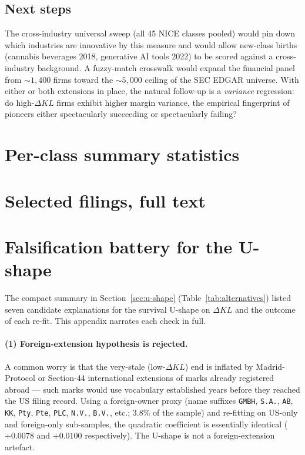 \documentclass[11pt]{article}
\begin{document}
\subsection*{Next steps}
The cross-industry universal sweep (all 45 NICE classes pooled) would
pin down which industries are innovative by this measure and would
allow new-class births (cannabis beverages 2018, generative AI tools
2022) to be scored against a cross-industry background. A
fuzzy-match crosswalk would expand the financial panel from $\sim 1{,}400$
firms toward the ${\sim}5{,}000$ ceiling of the SEC EDGAR universe. With
either or both extensions in place, the natural follow-up is a
\emph{variance} regression: do high-$\Delta KL$ firms exhibit higher
margin variance, the empirical fingerprint of pioneers either
spectacularly succeeding or spectacularly failing?

\appendix
\section{Per-class summary statistics}
\label{app:summary}



\section{Selected filings, full text}
\label{app:filings}



\section{Falsification battery for the U-shape}
\label{app:falsification}

The compact summary in Section~\ref{sec:u-shape}
(Table~\ref{tab:alternatives}) listed seven candidate explanations
for the survival U-shape on $\Delta KL$ and the outcome of each
re-fit. This appendix narrates each check in full.

\paragraph{(1) Foreign-extension hypothesis is rejected.}
A common worry is that the very-stale (low-$\Delta KL$) end is
inflated by Madrid-Protocol or Section-44 international extensions
of marks already registered abroad --- such marks would use
vocabulary established years before they reached the US filing
record. Using a foreign-owner proxy (name suffixes \texttt{GMBH},
\texttt{S.A.}, \texttt{AB}, \texttt{KK}, \texttt{Pty}, \texttt{Pte},
\texttt{PLC}, \texttt{N.V.}, \texttt{B.V.}, etc.; $3.8\%$ of the
sample) and re-fitting on US-only and foreign-only sub-samples,
the quadratic coefficient is essentially identical ($+0.0078$ and
$+0.0100$ respectively). The U-shape is not a foreign-extension
artefact.
\end{document}
